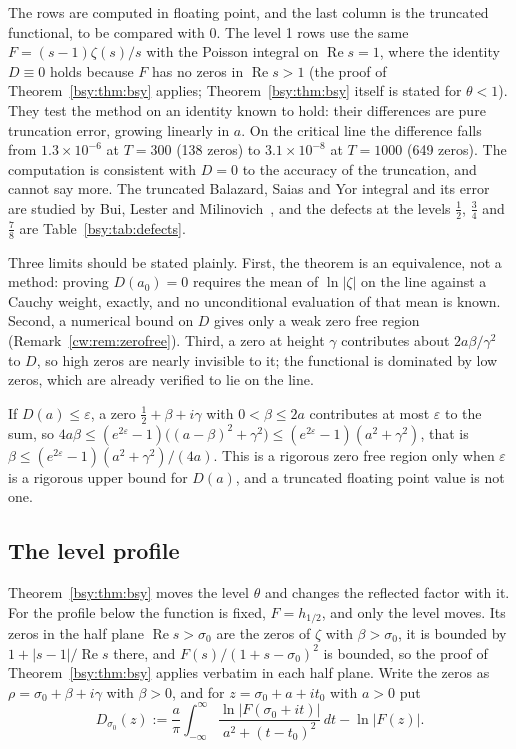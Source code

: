 The rows are computed in floating point, and the last column is the truncated functional, to be compared with 0. The level 1 rows use the same $F=(s-1)\zeta(s)/s$ with the Poisson integral on $\operatorname{Re}s=1$, where the identity $D\equiv0$ holds because $F$ has no zeros in $\operatorname{Re}s>1$ (the proof of Theorem~\ref{bsy:thm:bsy} applies; Theorem~\ref{bsy:thm:bsy} itself is stated for $\theta<1$). They test the method on an identity known to hold: their differences are pure truncation error, growing linearly in $a$. On the critical line the difference falls from $1.3\times10^{-6}$ at $T=300$ (138 zeros) to $3.1\times10^{-8}$ at $T=1000$ (649 zeros). The computation is consistent with $D=0$ to the accuracy of the truncation, and cannot say more. The truncated Balazard, Saias and Yor integral and its error are studied by Bui, Lester and Milinovich~\cite{BLM14}, and the defects at the levels $\frac12$, $\frac34$ and $\frac78$ are Table~\ref{bsy:tab:defects}.

Three limits should be stated plainly. First, the theorem is an equivalence, not a method: proving $D(a_0)=0$ requires the mean of $\ln|\zeta|$ on the line against a Cauchy weight, exactly, and no unconditional evaluation of that mean is known. Second, a numerical bound on $D$ gives only a weak zero free region (Remark~\ref{cw:rem:zerofree}). Third, a zero at height $\gamma$ contributes about $2a\beta/\gamma^2$ to $D$, so high zeros are nearly invisible to it; the functional is dominated by low zeros, which are already verified to lie on the line.

\begin{remark}\label{cw:rem:zerofree}
If $D(a)\le\varepsilon$, a zero $\frac12+\beta+i\gamma$ with $0<\beta\le2a$ contributes at most $\varepsilon$ to the sum, so $4a\beta\le(e^{2\varepsilon}-1)\big((a-\beta)^2+\gamma^2\big)\le(e^{2\varepsilon}-1)(a^2+\gamma^2)$, that is $\beta\le(e^{2\varepsilon}-1)(a^2+\gamma^2)/(4a)$. This is a rigorous zero free region only when $\varepsilon$ is a rigorous upper bound for $D(a)$, and a truncated floating point value is not one.
\end{remark}

\subsection{The level profile}\label{cw:sec:profile}
Theorem~\ref{bsy:thm:bsy} moves the level $\theta$ and changes the reflected factor with it. For the profile below the function is fixed, $F=h_{1/2}$, and only the level moves. Its zeros in the half plane $\operatorname{Re}s>\sigma_0$ are the zeros of $\zeta$ with $\beta>\sigma_0$, it is bounded by $1+|s-1|/\operatorname{Re}s$ there, and $F(s)/(1+s-\sigma_0)^2$ is bounded, so the proof of Theorem~\ref{bsy:thm:bsy} applies verbatim in each half plane. Write the zeros as $\rho=\sigma_0+\beta+i\gamma$ with $\beta>0$, and for $z=\sigma_0+a+it_0$ with $a>0$ put
\[
D_{\sigma_0}(z):=\frac a\pi\int_{-\infty}^\infty\frac{\ln|F(\sigma_0+it)|}{a^2+(t-t_0)^2}\,dt-\ln|F(z)| .
\]

